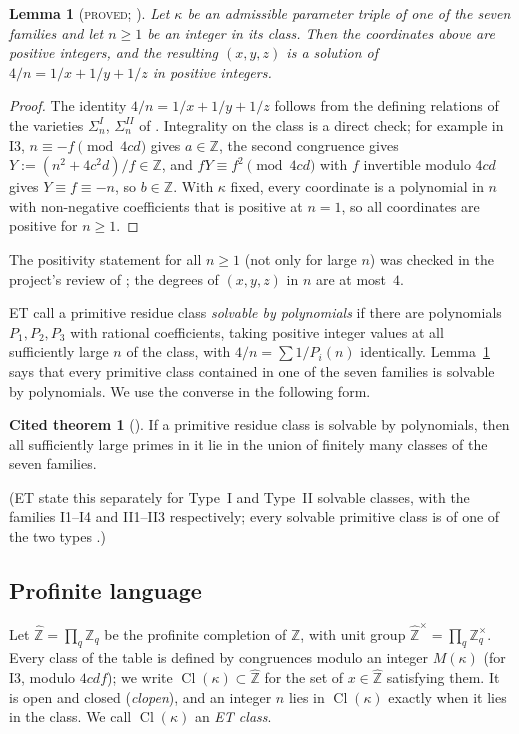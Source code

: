 \documentclass[11pt,reqno]{amsart}
\newtheorem{lemma}[theorem]{Lemma}
\theoremstyle{definition}
\newtheorem{citedthm}[theorem]{Cited theorem}
\newcommand{\Z}{\mathbb Z}
\newcommand{\Zh}{\widehat{\Z}}
\newcommand{\Zhu}{\widehat{\Z}^{\times}}
\newcommand{\Cl}{\operatorname{Cl}}
\newcommand{\status}[1]{\textup{\textsc{#1}}}
\begin{document}
\begin{lemma}[\status{proved}; {\cite[\S\S2, 10]{ET}}]\label{lem:solve}
Let $\kappa$ be an admissible parameter triple of one of the seven
families and let $n\ge1$ be an integer in its class.  Then the coordinates
above are positive integers, and the resulting $(x,y,z)$ is a solution of
$4/n=1/x+1/y+1/z$ in positive integers.
\end{lemma}

\begin{proof}
The identity $4/n=1/x+1/y+1/z$ follows from the defining relations of
the varieties $\Sigma^I_n$, $\Sigma^{II}_n$ of \cite[(2.1)--(2.9),
(2.13)--(2.21)]{ET}.  Integrality on the class is a direct check; for
example in I3, $n\equiv-f\pmod{4cd}$ gives $a\in\Z$, the second
congruence gives $Y:=(n^2+4c^2d)/f\in\Z$, and $fY\equiv f^2\pmod{4cd}$
with $f$ invertible modulo $4cd$ gives $Y\equiv f\equiv -n$, so $b\in\Z$.
With $\kappa$ fixed, every coordinate is a polynomial in $n$ with
non-negative coefficients that is positive at $n=1$, so all coordinates
are positive for $n\ge1$.
\end{proof}

The positivity statement for all $n\ge 1$ (not only for large $n$) was
checked in the project's review of \cite{PM}; the degrees of
$(x,y,z)$ in $n$ are at most~$4$.

ET call a primitive residue class \emph{solvable by polynomials} if there
are polynomials $P_1,P_2,P_3$ with rational coefficients, taking positive
integer values at all sufficiently large $n$ of the class, with
$4/n=\sum 1/P_i(n)$ identically.  Lemma~\ref{lem:solve} says that every
primitive class contained in one of the seven families is solvable by
polynomials.  We use the converse in the following form.

\begin{citedthm}[{\cite[Prop.~1.9]{ET}}]\label{cit:ET19}
If a primitive residue class is solvable by polynomials, then all
sufficiently large primes in it lie in the union of finitely many classes
of the seven families.
\end{citedthm}

(ET state this separately for Type~I and Type~II solvable classes, with
the families I1--I4 and II1--II3 respectively; every solvable primitive
class is of one of the two types \cite[p.~8]{ET}.)

\subsection{Profinite language}
Let $\Zh=\prod_q\Z_q$ be the profinite completion of $\Z$, with unit group
$\Zhu=\prod_q\Z_q^\times$.  Every class of the table is defined by
congruences modulo an integer $M(\kappa)$ (for I3, modulo $4cdf$); we
write $\Cl(\kappa)\subset\Zh$ for the set of $x\in\Zh$ satisfying them.
It is open and closed (\emph{clopen}), and an integer $n$ lies in
$\Cl(\kappa)$ exactly when it lies in the class.  We call $\Cl(\kappa)$
an \emph{ET class}.
\end{document}
